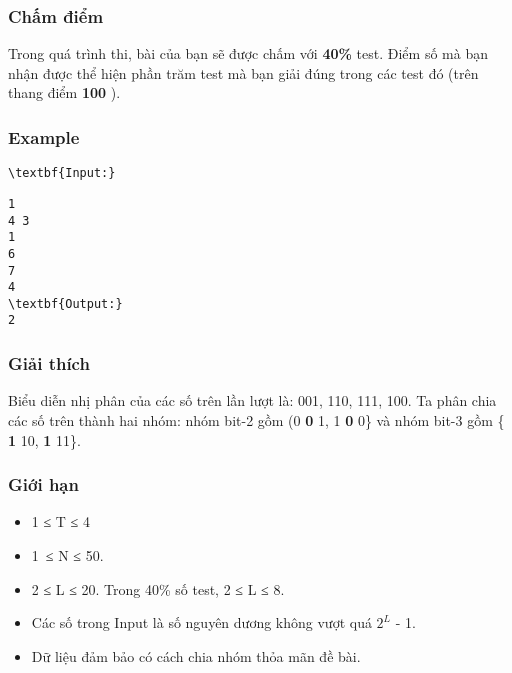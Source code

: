 \subsubsection{   Chấm điểm  }

   Trong quá trình thi, bài của bạn sẽ được chấm với   \textbf{    40\%   }   test. Điểm số mà bạn nhận được thể hiện phần trăm test mà bạn giải đúng trong các test đó (trên thang điểm   \textbf{    100   }   ).  

\subsubsection{   Example  }
\begin{verbatim}
\textbf{Input:}\end{verbatim}
\begin{verbatim}
1
4 3
1
6
7
4
\textbf{Output:}
2
\end{verbatim}

\subsubsection{   Giải thích  }

   Biểu diễn nhị phân của các số trên lần lượt là: 001, 110, 111, 100. Ta phân chia các số trên thành hai nhóm: nhóm bit-2 gồm (0   \textbf{    0   }   1, 1   \textbf{    0   }   0\} và nhóm bit-3 gồm \{   \textbf{    1   }   10,   \textbf{    1   }   11\}.  

\subsubsection{   Giới hạn  }
\begin{itemize}
	\item     1 ≤ T ≤ 4   
	\item     1 ≤ N ≤ 50.   
	\item     2 ≤ L ≤ 20. Trong 40\% số test, 2 ≤ L ≤ 8.   
	\item     Các số trong Input là số nguyên dương không vượt quá $2^{L}$    - 1.   
	\item     Dữ liệu đảm bảo có cách chia nhóm thỏa mãn đề bài.   
\end{itemize}
